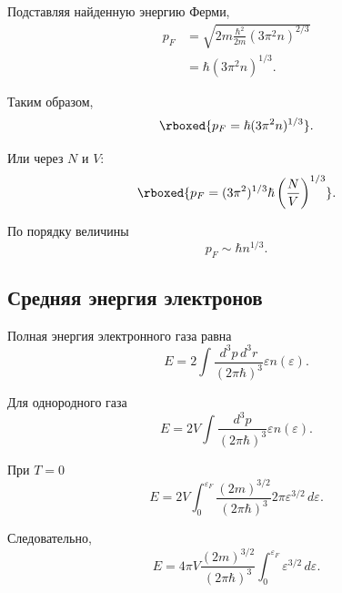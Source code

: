 \documentclass[../final.tex]{subfiles}
\begin{document}
Подставляя найденную энергию Ферми,
%
\begin{align*}
    p_F
    &=
    \sqrt{
        2m
        \frac{\hbar^2}{2m}
        (3\pi^2n)^{2/3}
    }
    \\[3pt]
    &=
    \hbar
    (3\pi^2n)^{1/3}.
\end{align*}

Таким образом,
%
\begin{equation*}
    \rboxed{
        p_F
        =
        \hbar
        (3\pi^2n)^{1/3}
    }.
\end{equation*}

Или через $N$ и $V$:
%
\begin{equation*}
    \rboxed{
        p_F
        =
        (3\pi^2)^{1/3}
        \hbar
        \left(
            \frac{N}{V}
        \right)^{1/3}
    }.
\end{equation*}

По порядку величины
%
\begin{equation*}
    p_F
    \sim
    \hbar n^{1/3}.
\end{equation*}



\subsection*{Средняя энергия электронов}

Полная энергия электронного газа равна
%
\begin{equation*}
    E
    =
    2
    \int
    \frac{
        d^3p\,d^3r
    }{
        (2\pi\hbar)^3
    }
    \varepsilon
    n(\varepsilon).
\end{equation*}

Для однородного газа
%
\begin{equation*}
    E
    =
    2V
    \int
    \frac{
        d^3p
    }{
        (2\pi\hbar)^3
    }
    \varepsilon
    n(\varepsilon).
\end{equation*}

При $T=0$
%
\begin{equation*}
    E
    =
    2V
    \int_0^{\varepsilon_F}
    \frac{
        (2m)^{3/2}
    }{
        (2\pi\hbar)^3
    }
    2\pi
    \varepsilon^{3/2}\,d\varepsilon.
\end{equation*}

Следовательно,
%
\begin{equation*}
    E
    =
    4\pi V
    \frac{
        (2m)^{3/2}
    }{
        (2\pi\hbar)^3
    }
    \int_0^{\varepsilon_F}
    \varepsilon^{3/2}\,d\varepsilon.
\end{equation*}
\end{document}
